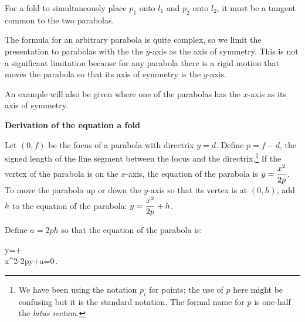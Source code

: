 For a fold to simultaneously place $p_1$ onto $l_1$ and $p_2$ onto $l_2$, it must be a tangent common to the two parabolas.

The formula for an arbitrary parabola is quite complex, so we limit the presentation to parabolas with the the $y$-axis as the axis of symmetry. This is not a significant limitation because for any parabola there is a rigid motion that moves the parabola so that its axis of symmetry is the $y$-axis.

An example will also be given where one of the parabolas has the $x$-axis as its axis of symmetry.

\newpage

\textbf{Derivation of the equation a fold}

Let $(0,f)$ be the focus of a parabola with directrix $y=d$. Define $p=f-d$, the signed length of the line segment between the focus and the directrix.\footnote{We have been using the notation $p_i$ for points; the use of $p$ here might be confusing but it is the standard notation. The formal name for $p$ is one-half the \emph{latus rectum}.} If the vertex of the parabola is on the $x$-axis, the equation of the parabola is $y=\displaystyle\frac{x^2}{2p}$. To move the parabola up or down the $y$-axis so that its vertex is at $(0,h)$, add $h$ to the equation of the parabola: $y=\displaystyle\frac{x^2}{2p}+h$.
\begin{center}
\end{center}
Define $a=2ph$ so that the equation of the parabola is:
\begin{form}{1.5}
y=+\\
x^2-2py+a=0\,.
\end{form}
